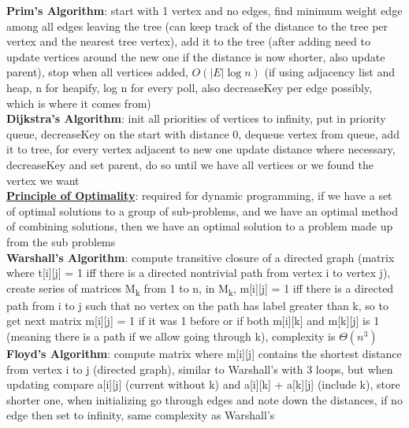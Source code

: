 \documentclass[a4paper]{article}
\begin{document}
\begin{multicols}{2}
        \textbf{Prim's Algorithm}: start with 1 vertex and no edges, find minimum weight edge among all edges leaving the tree (can keep track of the distance to the tree per vertex and the nearest tree vertex), add it to the tree (after adding need to update vertices around the new one if the distance is now shorter, also update parent), stop when all vertices added, $O(|E| \log n)$ (if using adjacency list and heap, n for heapify, log n for every poll, also decreaseKey per edge possibly, which is where it comes from)\\
        \textbf{Dijkstra's Algorithm}: init all priorities of vertices to infinity, put in priority queue, decreaseKey on the start with distance 0, dequeue vertex from queue, add it to tree, for every vertex adjacent to new one update distance where necessary, decreaseKey and set parent, do so until we have all vertices or we found the vertex we want\\
        \underline{\textbf{Principle of Optimality}}: required for dynamic programming, if we have a set of optimal solutions to a group of sub-problems, and we have an optimal method of combining solutions, then we have an optimal solution to a problem made up from the sub problems\\
        \textbf{Warshall's Algorithm}: compute transitive closure of a directed graph (matrix where t[i][j] = 1 iff there is a directed nontrivial path from vertex i to vertex j), create series of matrices M\textsubscript{k} from 1 to n, in M\textsubscript{k}, m[i][j] = 1 iff there is a directed path from i to j such that no vertex on the path has label greater than k, so to get next matrix m[i][j] = 1 if it was 1 before or if both m[i][k] and m[k][j] is 1 (meaning there is a path if we allow going through k), complexity is $\Theta (n^3)$\\
        \textbf{Floyd's Algorithm}: compute matrix where m[i][j] contains the shortest distance from vertex i to j (directed graph), similar to Warshall's with 3 loops, but when updating compare a[i][j] (current without k) and a[i][k] + a[k][j] (include k), store shorter one, when initializing go through edges and note down the distances, if no edge then set to infinity, same complexity as Warshall's\\
    \end{multicols}
    
\end{document}
